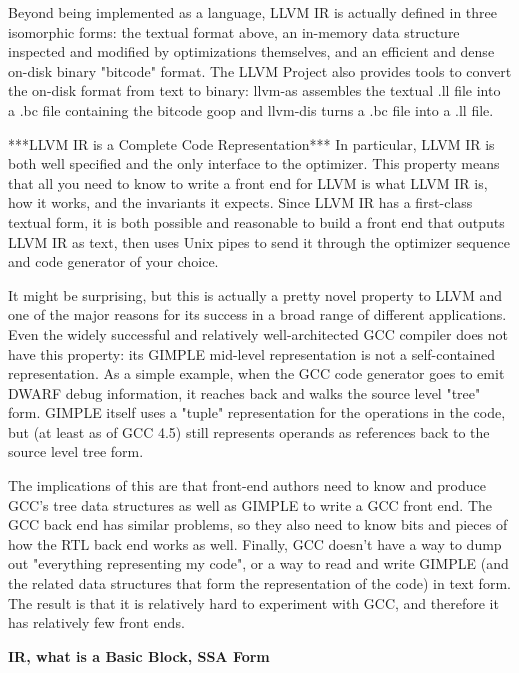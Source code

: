 Beyond being implemented as a language, LLVM IR is actually defined in three isomorphic forms: the textual format above, an in-memory data structure inspected and modified by optimizations themselves, and an efficient and dense on-disk binary "bitcode" format. The LLVM Project also provides tools to convert the on-disk format from text to binary: llvm-as assembles the textual .ll file into a .bc file containing the bitcode goop and llvm-dis turns a .bc file into a .ll file.

***LLVM IR is a Complete Code Representation***
In particular, LLVM IR is both well specified and the only interface to the optimizer. This property means that all you need to know to write a front end for LLVM is what LLVM IR is, how it works, and the invariants it expects. Since LLVM IR has a first-class textual form, it is both possible and reasonable to build a front end that outputs LLVM IR as text, then uses Unix pipes to send it through the optimizer sequence and code generator of your choice.

It might be surprising, but this is actually a pretty novel property to LLVM and one of the major reasons for its success in a broad range of different applications. Even the widely successful and relatively well-architected GCC compiler does not have this property: its GIMPLE mid-level representation is not a self-contained representation. As a simple example, when the GCC code generator goes to emit DWARF debug information, it reaches back and walks the source level "tree" form. GIMPLE itself uses a "tuple" representation for the operations in the code, but (at least as of GCC 4.5) still represents operands as references back to the source level tree form.

The implications of this are that front-end authors need to know and produce GCC's tree data structures as well as GIMPLE to write a GCC front end. The GCC back end has similar problems, so they also need to know bits and pieces of how the RTL back end works as well. Finally, GCC doesn't have a way to dump out "everything representing my code", or a way to read and write GIMPLE (and the related data structures that form the representation of the code) in text form. The result is that it is relatively hard to experiment with GCC, and therefore it has relatively few front ends.


\textbf{IR, what is a Basic Block, SSA Form}
